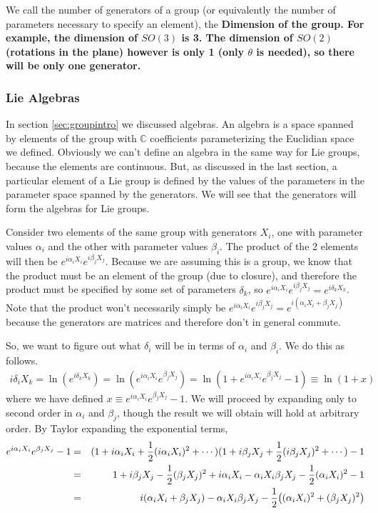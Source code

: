 \documentclass[12pt,epsf]{article}
\def\nolabel{\nonumber }
\def\nolabel{\nonumber }
\begin{document}
We call the number of generators of a group (or equivalently the number
of parameters necessary to specify an element), the \bf Dimension \rm
of the group.  For example, the dimension of $SO(3)$ is 3.  The
dimension of $SO(2)$ (rotations in the plane) however is only 1 (only
$\theta$ is needed), so there will be only one generator.  

\subsubsection{Lie Algebras}

In section \ref{sec:groupintro} we discussed algebras.	An algebra is a
space spanned by elements of the group with $\mathbb{C}$ coefficients
parameterizing the Euclidian space we defined.	Obviously we can't
define an algebra in the same way for Lie groups, because the elements
are continuous.  But, as discussed in the last section, a particular
element of a Lie group is defined by the values of the parameters in
the parameter space spanned by the generators.	We will see that the
generators will form the algebras for Lie groups.  

Consider two elements of the same group with generators $X_i$, one with
parameter values $\alpha_i$ and the other with parameter values
$\beta_i$.  The product of the 2 elements will then be
$e^{i\alpha_iX_i}e^{i\beta_jX_j}$.  Because we are assuming this is a
group, we know that the product must be an element of the group (due to
closure), and therefore the product must be specified by some set of
parameters $\delta_k$, so $e^{i\alpha_iX_i}e^{i\beta_jX_j} = e^{i
\delta_k X_k}$.  Note that the product won't necessarily simply be
$e^{i\alpha_iX_i}e^{i\beta_jX_j} = e^{i(\alpha_iX_i + \beta_jX_j)}$
because the generators are matrices and therefore don't in general
commute.  

So, we want to figure out what $\delta_i$ will be in terms of
$\alpha_i$ and $\beta_i$.  We do this as follows.  
\begin{eqnarray}
i \delta_i X_k = \ln(e^{i \delta_k X_k}) =
\ln(e^{i\alpha_iX_i}e^{\beta_jX_j}) = \ln(1+
e^{i\alpha_iX_i}e^{\beta_jX_j} -1) \equiv \ln(1+x) \nolabel 
\end{eqnarray}
where we have defined $x \equiv e^{i\alpha_iX_i}e^{ \beta_jX_j} - 1$. 
We will proceed by expanding only to second order in $\alpha_i$ and
$\beta_j$, though the result we will obtain will hold at arbitrary
order.	By Taylor expanding the exponential terms,
\begin{eqnarray}
e^{i\alpha_iX_i}e^{\beta_jX_j} - 1 &=& (1+i\alpha_iX_i+{1\over
2}(i\alpha_iX_i)^2+ \cdots)(1+i\beta_jX_j+{1\over
2}(i\beta_jX_j)^2+\cdots)-1 \nolabel \\
&=& 1+i\beta_jX_j - {1\over 2}(\beta_jX_j)^2+i\alpha_iX_i -
\alpha_iX_i\beta_jX_j-{1\over 2}(\alpha_iX_i)^2 - 1 \nolabel \\
&=& i(\alpha_iX_i + \beta_jX_j) - \alpha_iX_i\beta_jX_j - {1\over
2}\big((\alpha_iX_i)^2+(\beta_jX_j)^2\big) \nolabel
\end{eqnarray}
\end{document}
